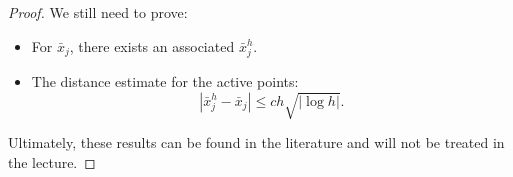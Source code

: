 \documentclass[../skript.tex]{subfiles}
\begin{document}
\begin{proof}
We still need to prove:
\begin{itemize}
\item For $\bar{x}_j$, there exists an associated $\bar{x}_j^h$.
\item The distance estimate for the active points:
\[
	 \left| \bar{x}_j^h - \bar{x}_j \right| \leq c h \sqrt{|\log h|}.
\]
\end{itemize}
Ultimately, these results can be found in the literature and will not be treated in the lecture.
\end{proof}
\end{document}
